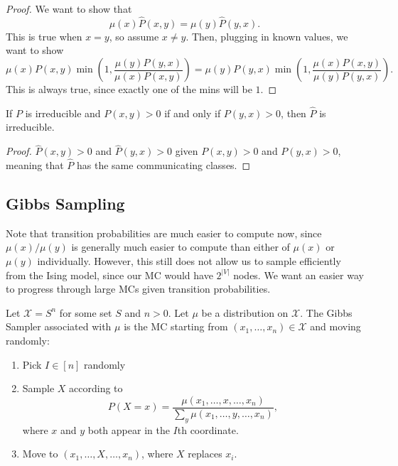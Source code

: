 \begin{proof}
We want to show that 
\[\mu(x)\hat{P}(x,y) = \mu(y)\hat{P}(y,x).\]
This is true when $x=y$, so assume $x\neq y$. Then, plugging in known values, we want to show
\[\mu(x)P(x,y)\min\left(1,\frac{\mu(y)P(y,x)}{\mu(x)P(x,y)}\right) = \mu(y)P(y,x)\min\left(1,\frac{\mu(x)P(x,y)}{\mu(y)P(y,x)}\right).\]
This is always true, since exactly one of the mins will be $1$. 
\end{proof}

\begin{theorem}
\lemlabel

If $P$ is irreducible and $P(x,y)>0$ if and only if $P(y,x)>0$, then $\hat{P}$ is irreducible. 
\end{theorem}

\begin{proof}
$\hat{P}(x,y)>0$ and $\hat{P}(y,x)>0$ given $P(x,y)>0$ and $P(y,x)>0$, meaning that $\hat{P}$ has the same communicating classes. 
\end{proof}

\subsection{Gibbs Sampling}

Note that transition probabilities are much easier to compute now, since $\mu(x)/\mu(y)$ is generally much easier to compute than either of $\mu(x)$ or $\mu(y)$ individually. However, this still does not allow us to sample efficiently from the Ising model, since our MC would have $2^{\vert V\vert}$ nodes. We want an easier way to progress through large MCs given transition probabilities. 

\begin{definition}

Let $\mathcal{X}=S^n$ for some set $S$ and $n>0$. Let $\mu$ be a distribution on $\mathcal{X}$. The \ac{Gibbs Sampler} associated with $\mu$ is the MC starting from $(x_1, \hdots, x_n)\in \mathcal{X}$ and moving randomly: 
\begin{enumerate}
    \item Pick $I\in [n]$ randomly 
    \item Sample $X$ according to 
    \[P(X=x) = \frac{\mu(x_1, \hdots, x, \hdots, x_n)}{\sum_y\mu(x_1, \hdots, y, \hdots, x_n)},\]
    where $x$ and $y$ both appear in the $I$th coordinate.
    \item Move to $(x_1, \hdots, X, \hdots, x_n)$, where $X$ replaces $x_i$. 
\end{enumerate}
\end{definition}

